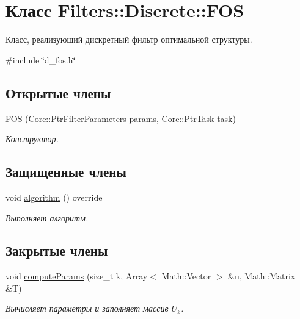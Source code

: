 \hypertarget{class_filters_1_1_discrete_1_1_f_o_s}{}\section{Класс Filters\+:\+:Discrete\+:\+:F\+OS}
\label{class_filters_1_1_discrete_1_1_f_o_s}


Класс, реализующий дискретный фильтр оптимальной структуры.  




{\ttfamily \#include \char`\"{}d\+\_\+fos.\+h\char`\"{}}

\subsection*{Открытые члены}
\begin{DoxyCompactItemize}
\item 
\hyperlink{class_filters_1_1_discrete_1_1_f_o_s_a4ccb53bc00846f7ca140b55316241749}{F\+OS} (\hyperlink{namespace_core_a4811af8148ba137d644b9a61a042cf03}{Core\+::\+Ptr\+Filter\+Parameters} \hyperlink{class_core_1_1_filter_a44aa749b49ba46256975ce545531ecf7}{params}, \hyperlink{namespace_core_abfda8f69fcacfcea2696549b548ed737}{Core\+::\+Ptr\+Task} task)\hypertarget{class_filters_1_1_discrete_1_1_f_o_s_a4ccb53bc00846f7ca140b55316241749}{}\label{class_filters_1_1_discrete_1_1_f_o_s_a4ccb53bc00846f7ca140b55316241749}

\begin{DoxyCompactList}\small\item\em Конструктор. \end{DoxyCompactList}\end{DoxyCompactItemize}
\subsection*{Защищенные члены}
\begin{DoxyCompactItemize}
\item 
void \hyperlink{class_filters_1_1_discrete_1_1_f_o_s_a66b52dd04e77257393fe156b71e5582f}{algorithm} () override
\begin{DoxyCompactList}\small\item\em Выполняет алгоритм. \end{DoxyCompactList}\end{DoxyCompactItemize}
\subsection*{Закрытые члены}
\begin{DoxyCompactItemize}
\item 
void \hyperlink{class_filters_1_1_discrete_1_1_f_o_s_a2bf612c50a41e892050593ba705c3b79}{compute\+Params} (size\+\_\+t k, Array$<$ Math\+::\+Vector $>$ \&u, Math\+::\+Matrix \&T)
\begin{DoxyCompactList}\small\item\em Вычисляет параметры и заполняет массив $U_k$. \end{DoxyCompactList}\end{DoxyCompactItemize}
